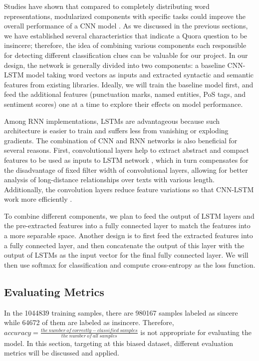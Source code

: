 \documentclass[12pt]{diazessay} %
\begin{document}
Studies have shown that compared to completely distributing word representations, modularized components with specific tasks could improve the overall performance of a CNN model \citep{poria2017}. As we discussed in the previous sections, we have established several characteristics that indicate a Quora question to be insincere; therefore, the idea of combining various components each responsible for detecting different classification clues can be valuable for our project. In our design, the network is generally divided into two components: a baseline CNN-LSTM model taking word vectors as inputs and extracted syntactic and semantic features from existing libraries. Ideally, we will train the baseline model first, and feed the additional features (punctuation marks, named entities, PoS tags, and sentiment scores) one at a time to explore their effects on model performance. 

Among RNN implementations, LSTMs are advantageous because such architecture is easier to train and suffers less from vanishing or exploding gradients. The combination of CNN and RNN networks is also beneficial for several reasons. First, convolutional layers help to extract abstract and compact features to be used as inputs to LSTM network \citep{chan2015}, which in turn compensates for the disadvantage of fixed filter width of convolutional layers, allowing for better analysis of long-distance relationships over texts with various length. Additionally, the convolution layers reduce feature variations so that CNN-LSTM work more efficiently \citep{ghosh2016}.

To combine different components, we plan to feed the output of LSTM layers and the pre-extracted features into a fully connected layer to match the features into a more separable space. Another design is to first feed the extracted features into a fully connected layer, and then concatenate the output of this layer with the output of LSTMs as the input vector for the final fully connected layer. We will then use softmax for classification and compute cross-entropy as the loss function. 

\subsection{Evaluating Metrics}

In the \num[group-separator={,}]{1044839} training samples, there are \num[group-separator={,}]{980167} samples labeled as sincere while \num[group-separator={,}]{64672} of them are labeled as insincere. Therefore, $accuracy = \frac{ the\ number\ of\ correctly-classified\ samples}{the\ number\ of\ all\ samples}$ is not appropriate for evaluating the model. In this section, targeting at this biased dataset, different evaluation metrics will be discussed and applied.
\end{document}
